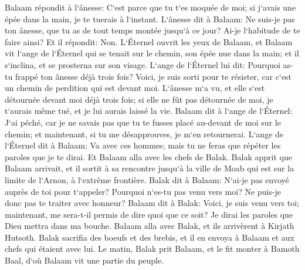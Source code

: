 \verse Balaam répondit à l`ânesse: C`est parce que tu t`es moquée de moi; si j`avais une épée dans la main, je te tuerais à l`instant. 
\verse L`ânesse dit à Balaam: Ne suis-je pas ton ânesse, que tu as de tout temps montée jusqu`à ce jour? Ai-je l`habitude de te faire ainsi? Et il répondit: Non. 
\verse L`Éternel ouvrit les yeux de Balaam, et Balaam vit l`ange de l`Éternel qui se tenait sur le chemin, son épée nue dans la main; et il s`inclina, et se prosterna sur son visage. 
\verse L`ange de l`Éternel lui dit: Pourquoi as-tu frappé ton ânesse déjà trois fois? Voici, je suis sorti pour te résister, car c`est un chemin de perdition qui est devant moi. 
\verse L`ânesse m`a vu, et elle s`est détournée devant moi déjà trois fois; si elle ne fût pas détournée de moi, je t`aurais même tué, et je lui aurais laissé la vie. 
\verse Balaam dit à l`ange de l`Éternel: J`ai péché, car je ne savais pas que tu te fusses placé au-devant de moi sur le chemin; et maintenant, si tu me désapprouves, je m`en retournerai. 
\verse L`ange de l`Éternel dit à Balaam: Va avec ces hommes; mais tu ne feras que répéter les paroles que je te dirai. Et Balaam alla avec les chefs de Balak. 
\verse Balak apprit que Balaam arrivait, et il sortit à sa rencontre jusqu`à la ville de Moab qui est sur la limite de l`Arnon, à l`extrême frontière. 
\verse Balak dit à Balaam: N`ai-je pas envoyé auprès de toi pour t`appeler? Pourquoi n`es-tu pas venu vers moi? Ne puis-je donc pas te traiter avec honneur? 
\verse Balaam dit à Balak: Voici, je suis venu vers toi; maintenant, me sera-t-il permis de dire quoi que ce soit? Je dirai les paroles que Dieu mettra dans ma bouche. 
\verse Balaam alla avec Balak, et ils arrivèrent à Kirjath Hutsoth. 
\verse Balak sacrifia des boeufs et des brebis, et il en envoya à Balaam et aux chefs qui étaient avec lui. 
\verse Le matin, Balak prit Balaam, et le fit monter à Bamoth Baal, d`où Balaam vit une partie du peuple. 

